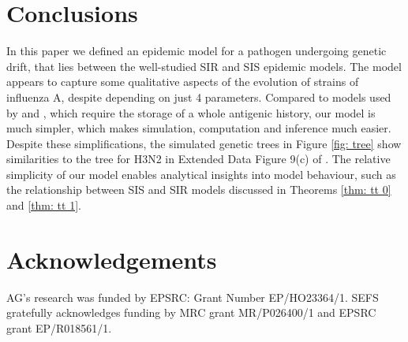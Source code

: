\documentclass[review]{elsarticle}
\begin{document}

\section{Conclusions}
In this paper we defined an epidemic model for a pathogen undergoing genetic drift, that lies between the well-studied SIR and SIS epidemic models. The model appears to capture some qualitative aspects of the evolution of strains of influenza A, despite depending on just 4 parameters. Compared to models used by \cite{bedford2015} and \cite{parisi2013}, which require the storage of a whole antigenic history, our model is much simpler, which makes simulation, computation and inference much easier. Despite these simplifications, the simulated genetic trees in Figure \ref{fig: tree} show similarities to the tree for H3N2 in Extended Data Figure 9(c) of \cite{bedford2015}. %
The relative simplicity of our model enables analytical insights into model behaviour, such as the relationship between SIS and SIR models discussed in Theorems  \ref{thm: tt 0} and \ref{thm: tt 1}.

\section*{Acknowledgements}
AG's research was funded by EPSRC: Grant Number EP/HO23364/1. SEFS gratefully acknowledges funding by MRC grant MR/P026400/1 and EPSRC grant EP/R018561/1.


\end{document}
